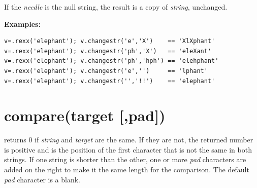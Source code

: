 If the \emph{needle} is the null string, the result is a copy of
\emph{string}, unchanged.
 
\textbf{Examples:}
\begin{lstlisting}
v=.rexx('elephant'); v.changestr('e','X')    == 'XlXphant'
v=.rexx('elephant'); v.changestr('ph','X')   == 'eleXant'
v=.rexx('elephant'); v.changestr('ph','hph') == 'elehphant'
v=.rexx('elephant'); v.changestr('e','')     == 'lphant'
v=.rexx('elephant'); v.changestr('','!!')    == 'elephant'
\end{lstlisting}


\section{compare(target [,pad{]})}\label{refcompar}

returns 0 if \emph{string} and \emph{target}
are the same.
If they are not, the returned number is positive and is the position of
the first character that is not the same in both strings.
If one string is shorter than the other, one or more \emph{pad}
characters are added on the right to make it the same length for the
comparison.
The default \emph{pad} character is a blank.
 
